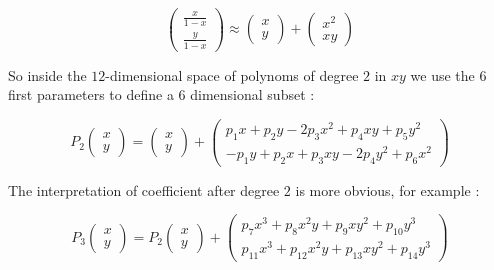 \begin{equation}
   \begin{pmatrix}  \frac{x}{1-x} \\  \frac{y}{1-x}  \end{pmatrix}
  \approx \begin{pmatrix}   x  \\  y  \end{pmatrix}
          + \begin{pmatrix}   x^2  \\  xy  \end{pmatrix}
   \label{Rot:Deg2}
\end{equation}

So inside  the $12$-dimensional space of polynoms of degree $2$ in $xy$ we
use the $6$ first parameters to define a  $6$ dimensional subset :


\begin{equation}
   P_2 \begin{pmatrix}  x \\  y  \end{pmatrix}
   = \begin{pmatrix}  x \\  y  \end{pmatrix}
     + \begin{pmatrix}  p_1 x  + p_2 y -2 p_3 x^2  + p_4 xy + p_5 y^2
                     \\ -p_1y + p_2 x  + p_3 xy - 2 p_4 y^2 + p_6 x^2 \end{pmatrix}
\end{equation}


The interpretation of coefficient after degree $2$ is more obvious, for example :

\begin{equation}
   P_3 \begin{pmatrix}  x \\  y  \end{pmatrix}
   = P_2 \begin{pmatrix}  x \\  y  \end{pmatrix}
     +    \begin{pmatrix}  p_7 x^3 + p_8 x^2y + p_9 xy^2 + p_{10} y^3
                        \\  p_{11} x^3 + p_{12} x^2y + p_{13} xy^2 + p_{14} y^3   \end{pmatrix}
\end{equation}



